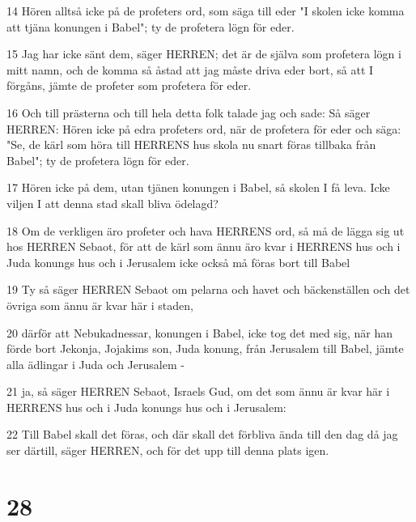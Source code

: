 \par 14 Hören alltså icke på de profeters ord, som säga till eder "I skolen icke komma att tjäna konungen i Babel"; ty de profetera lögn för eder.
\par 15 Jag har icke sänt dem, säger HERREN; det är de själva som profetera lögn i mitt namn, och de komma så åstad att jag måste driva eder bort, så att I förgåns, jämte de profeter som profetera för eder.
\par 16 Och till prästerna och till hela detta folk talade jag och sade: Så säger HERREN: Hören icke på edra profeters ord, när de profetera för eder och säga: "Se, de kärl som höra till HERRENS hus skola nu snart föras tillbaka från Babel"; ty de profetera lögn för eder.
\par 17 Hören icke på dem, utan tjänen konungen i Babel, så skolen I få leva. Icke viljen I att denna stad skall bliva ödelagd?
\par 18 Om de verkligen äro profeter och hava HERRENS ord, så må de lägga sig ut hos HERREN Sebaot, för att de kärl som ännu äro kvar i HERRENS hus och i Juda konungs hus och i Jerusalem icke också må föras bort till Babel
\par 19 Ty så säger HERREN Sebaot om pelarna och havet och bäckenställen och det övriga som ännu är kvar här i staden,
\par 20 därför att Nebukadnessar, konungen i Babel, icke tog det med sig, när han förde bort Jekonja, Jojakims son, Juda konung, från Jerusalem till Babel, jämte alla ädlingar i Juda och Jerusalem -
\par 21 ja, så säger HERREN Sebaot, Israels Gud, om det som ännu är kvar här i HERRENS hus och i Juda konungs hus och i Jerusalem:
\par 22 Till Babel skall det föras, och där skall det förbliva ända till den dag då jag ser därtill, säger HERREN, och för det upp till denna plats igen.

\chapter{28}

